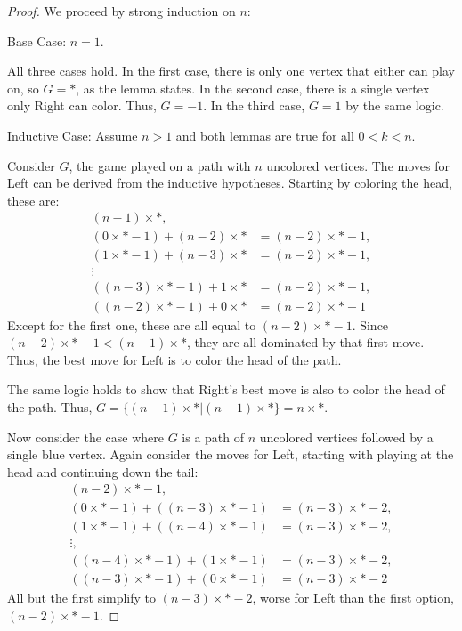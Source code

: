 \documentclass[letter,10pt]{article}
\begin{document}
\begin{proof}

  We proceed by strong induction on $n$:
  
  Base Case: $n = 1$.
  
  All three cases hold.  In the first case, there is only one vertex that either can play on, so $G = *$, as the lemma states.  In the second case, there is a single vertex only Right can color.  Thus, $G = -1$.  In the third case, $G = 1$ by the same logic.
  
  Inductive Case: Assume $n > 1$ and both lemmas are true for all $0 < k < n$.
  
  Consider $G$, the game played on a path with $n$ uncolored vertices.  The moves for Left can be derived from the inductive hypotheses.  Starting by coloring the head, these are: 
  \begin{align*}
    (n-1) \times *, \\
    (0 \times * - 1) + (n-2) \times * & = (n-2) \times * - 1, \\
    (1 \times * - 1) + (n-3) \times * & = (n-2) \times * - 1, \\ 
    \vdots\\ 
    ((n-3) \times * - 1) + 1 \times * & = (n-2) \times * - 1, \\
    ((n-2) \times * - 1) + 0 \times * & = (n-2) \times * - 1
  \end{align*}
  Except for the first one, these are all equal to $(n-2) \times * - 1$.  Since $(n-2)\times * - 1 < (n-1) \times *$, they are all dominated by that first move.  Thus, the best move for Left is to color the head of the path.
  
  The same logic holds to show that Right's best move is also to color the head of the path.  Thus, $G = \{(n-1) \times * | (n-1) \times *\} =  n \times *$.
  
  Now consider the case where $G$ is a path of $n$ uncolored vertices followed by a single blue vertex.  Again consider the moves for Left, starting with playing at the head and continuing down the tail: 
  \begin{align*}
    (n-2) \times * - 1, & \\
    (0 \times * - 1) + ((n-3) \times * - 1) & = (n-3) \times * - 2, \\
    (1 \times * - 1) + ((n-4) \times * - 1) & = (n-3) \times * - 2, \\
    \vdots, \\
    ((n-4) \times * - 1) + (1 \times * - 1) & = (n-3) \times * - 2, \\
    ((n-3) \times * - 1) + (0 \times * - 1) & = (n-3) \times * - 2
  \end{align*}
  All but the first simplify to $(n-3) \times * - 2$, worse for Left than the first option, $(n-2) \times * - 1$.
  

\end{proof}
\end{document}
